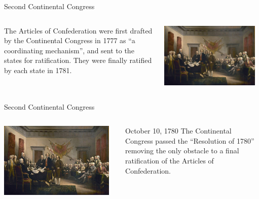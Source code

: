 \begin{frame}{Second Continental Congress}
    \begin{columns}[onlytextwidth]
            The Articles of Confederation were first drafted by the Continental Congress in 1777 as ``a coordinating mechanism'', and sent to the states for ratification. They were finally ratified by each state in 1781.

            \centering
            \includegraphics[width=0.95\textwidth]{img/continental-congress.jpg} \\
    \end{columns}
\end{frame}

\begin{frame}{Second Continental Congress}
    \begin{columns}[onlytextwidth]
            \centering
            \includegraphics[width=0.95\textwidth]{img/continental-congress.jpg} \\

            \begin{block}{October 10, 1780}
                The Continental Congress passed the ``Resolution of 1780'' removing the only obstacle to a final ratification of the Articles of Confederation.
            \end{block}
    \end{columns}
\end{frame}

